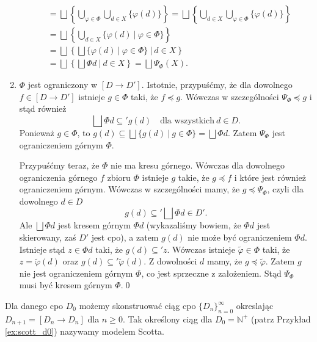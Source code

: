\begin{dowod}
\begin{enumerate}
\begin{align*}
                        &= \bigsqcup \left\{\bigcup\limits_{\varphi\in\Phi}\bigcup\limits_{d\in X}\{\varphi(d)\}\right\}
                         =\bigsqcup \left\{\bigcup\limits_{d\in X}\bigcup\limits_{\varphi\in\Phi}\{\varphi(d)\}\right\}\\
                        &= \bigsqcup \left\{\bigcup\limits_{d\in X}\{\varphi(d)\ |\ \varphi\in\Phi \}\right\}\\
                        &= \bigsqcup \left\{\bigsqcup \{\varphi(d)\ |\ \varphi\in\Phi \}\ |\ d\in X\right\}\\
                        &= \bigsqcup \left\{\bigsqcup \Phi d\ |\ d\in X\right\}
                        = \bigsqcup \Psi_\Phi(X).
          \end{align*}
        \item \(\Phi\) jest ograniczony w \([D\to D']\). Istotnie, przypuśćmy, że dla dowolnego \(f\in[D\to D']\) istnieje \(g\in\Phi\) taki, że \(f\preceq g\). Wówczas w szczególności \(\Psi_\Phi \preceq g\) i stąd również
          \[
            \bigsqcup \Phi d \subseteq' g(d)\quad \text{dla wszystkich}\ d\in D.
          \]
          Ponieważ \(g\in\Phi\), to \(g(d)\subseteq \bigsqcup\{g(d)\ |\ g\in\Phi\}=\bigsqcup\Phi d\). Zatem \(\Psi_\Phi\) jest ograniczeniem górnym \(\Phi\).

          Przypuśćmy teraz, że \(\Phi\) nie ma kresu górnego. Wówczas dla dowolnego ograniczenia górnego \(f\) zbioru \(\Phi\) istnieje \(g\) takie, że \(g\preceq f\) i które jest również ograniczeniem górnym. Wówczas w szczególności mamy, że \(g\preceq \Psi_\Phi\), czyli dla dowolnego \(d\in D\)
          \[
            g(d) \subseteq' \bigsqcup \Phi  d\in D'.
          \]
          Ale \(\bigsqcup \Phi d\) jest kresem górnym \(\Phi d\) (wykazaliśmy bowiem, że \(\Phi d\) jest skierowany, zaś \(D'\) jest cpo), a zatem \(g(d)\) nie może być ograniczeniem \(\Phi d\). Istnieje stąd \(z\in \Phi d\) taki, że \(g(d)\subseteq' z\). Wówczas istnieje \(\tilde\varphi\in\Phi\) taki, że \(z=\tilde\varphi(d)\) oraz \(g(d)\subseteq' \tilde\varphi(d)\). Z dowolności \(d\) mamy, że \(g\preceq \tilde\varphi\). Zatem \(g\) nie jest ograniczeniem górnym \(\Phi\), co jest sprzeczne z założeniem. Stąd \(\Psi_\Phi\) musi być kresem górnym \(\Phi\).\qed
      \end{enumerate}
\end{dowod}
  \begin{wniosek}\label{thm:scott_seq}
    Dla danego cpo \(D_0\) możemy skonstruować ciąg cpo \(\{D_n\}_{n=0}^{\infty}\) okreslając \(D_{n+1}=[D_n\to D_n]\) dla \(n\geq 0\). Tak określony ciąg dla \(D_0=\mathbb{N}^{+}\) (patrz Przykład \ref{ex:scott_d0}) nazywamy modelem Scotta.
  \end{wniosek}
